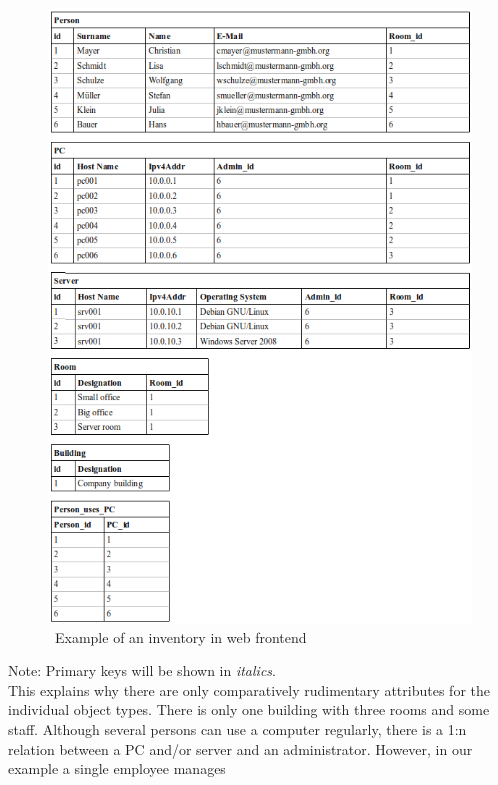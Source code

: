\documentclass[a4paper,10pt]{book}
\begin{document}
\newline
\begin{figure}[htb!]
  \centering
  \includegraphics[scale=.45]{Screenshot/SyncAPI_Fallstudie_01-en.png}
  \caption{\label{Example of an inventory in web frontend} \ Example of an inventory in web frontend}
\end{figure}
\newline
Note: Primary keys will be shown in \textit{italics}.
\newline\\
This explains why there are only comparatively rudimentary attributes for the individual object types. There is
only one building with three rooms and some staff. Although several persons can use a computer regularly, there is
a 1:n relation between a PC and/or server and an administrator. However, in our example a single employee manages
\end{document}
